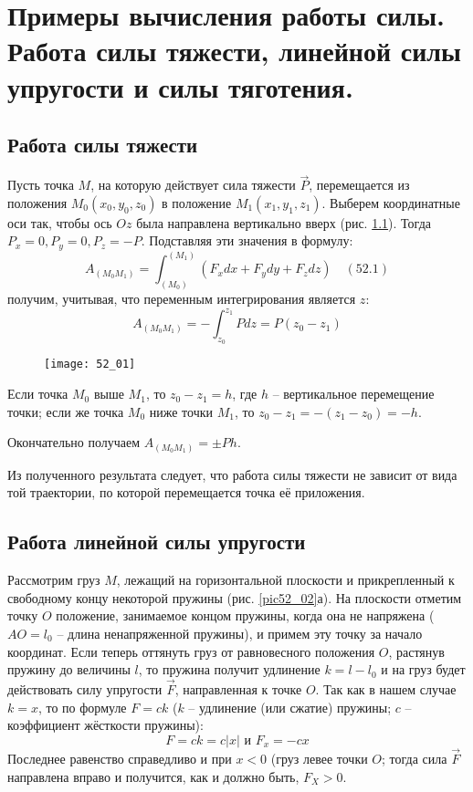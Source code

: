 \chapter{Примеры вычисления работы силы. Работа силы тяжести, линейной силы
упругости и силы тяготения.}

\section{Работа силы тяжести}
Пусть точка \( M \), на которую действует сила тяжести \( \vec{P} \), 
перемещается из положения \( M_0(x_0, y_0, z_0) \) в положение 
\( M_1(x_1, y_1, z_1) \). Выберем координатные оси так, чтобы ось \( Oz \) 
была направлена вертикально вверх (рис. \ref{pic52_01}). Тогда 
\( P_x = 0, P_y = 0, P_z = -P \). Подставляя эти значения в формулу:
\[ 
    A_{(M_0 M_1)} = \int_{(M_0)}^{(M_1)} 
    \left( F_x dx + F_y dy + F_z dz \right) \quad (52.1)
\]
получим, учитывая, что переменным интегрирования является \( z \):
\[ 
    A_{(M_0 M_1)} = - \int_{z_0}^{z_1} Pdz = 
    P\left(z_0 - z_1 \right) 
\]

\begin{figure}[h!]
    \texttt{[image: 52\_01]}
    \parbox{.47\textwidth}{\caption{} \label{pic52_01}}
\end{figure}

Если точка \( M_0 \) выше \( M_1 \), то \( z_0 - z_1 = h \), где 
\( h \) -- вертикальное перемещение точки; если же точка \( M_0 \) ниже 
точки \( M_1 \), то \( z_0 - z_1 = -\left(z_1 - z_0\right) = -h \).

Окончательно получаем \( A_{(M_0 M_1)} = \pm Ph \).

Из полученного результата следует, что работа силы тяжести не зависит от 
вида той траектории, по которой перемещается точка её приложения.

\section{Работа линейной силы упругости}
Рассмотрим груз \( M \), лежащий на горизонтальной плоскости и 
прикрепленный к свободному концу некоторой пружины (рис. \ref{pic52_02}а). На 
плоскости отметим точку \( O \) положение, занимаемое концом пружины, 
когда она не напряжена (\( AO = l_0 \) -- длина ненапряженной пружины), и 
примем эту точку за начало координат. Если теперь оттянуть груз от 
равновесного положения \( O \), растянув пружину до величины \( l \), то
пружина получит удлинение \( k = l - l_0 \) и на груз будет действовать 
силу упругости \( \vec{F} \), направленная к точке \( O \). Так как в 
нашем случае \( k = x \), то по формуле \( F = ck \) 
(\( k \) -- удлинение (или сжатие) пружины; \( c \) -- коэффициент 
жёсткости пружины):
\[ F = ck = c|x| \text{ и } F_x = -cx \]
Последнее равенство справедливо и при \( x < 0 \) 
(груз левее точки \( O \); тогда сила \( \vec{F} \) направлена вправо и 
получится, как и должно быть, \( F_X > 0 \).

